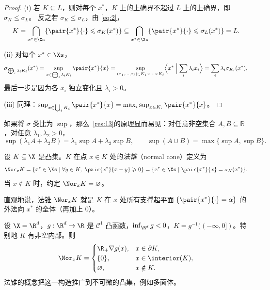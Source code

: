 \begin{proof}
(i) 若 $K\subseteq L$，则对每个 $x^*$，$K$ 上的上确界不超过 $L$ 上的上确界，即 $\sigma_K\leqslant\sigma_L$。
反之若 $\sigma_K\leqslant\sigma_L$，由 \eqref{eq:2}，
\[
  K=\bigcap_{x^*\in\Xs}\{\pair{x^*}{\cdot}\leqslant\sigma_K(x^*)\}\subseteq\bigcap_{x^*\in\Xs}\{\pair{x^*}{\cdot}\leqslant\sigma_L(x^*)\}=L .
\]

(ii) 对每个 $x^*\in\Xs$，
\[
  \sigma_{\bigoplus_i\lambda_iK_i}(x^*)=\sup_{x\in\bigoplus_i\lambda_iK_i}\pair{x^*}{x}
  =\sup_{(x_1,\dots,x_\ell)\in K_1\times\dots\times K_\ell}\Bigl\langle x^*\Bigm|\sum_i\lambda_ix_i\Bigr\rangle
  =\sum_i\lambda_i\sigma_{K_i}(x^*),
\]
最后一步是因为各 $x_i$ 独立变化且 $\lambda_i>0$。

(iii) 同理：$\sup_{x\in\bigcup_iK_i}\pair{x^*}{x}=\max_i\sup_{x\in K_i}\pair{x^*}{x}$。
\end{proof}

\begin{remark}
如果将 $\sigma$ 类比为 $\sup$，那么~\ref{res:13}的原理显而易见：对任意非空集合 $A,B\subseteq\mathbb R$，对任意 $\lambda_1,\lambda_2>0$，
\[
  \sup(\lambda_1A+\lambda_2B)=\lambda_1\sup A+\lambda_2\sup B,\qquad \sup(A\cup B)=\max\{\sup A,\sup B\}. 
\]
\end{remark}

\begin{definition}[法锥]
\label{def:10}
设 $K\subseteq\X$ 是凸集。$K$ 在点 $x\in K$ 处的\emph{法锥}（normal cone）定义为
\[
  \Nor_xK=\{x^*\in\Xs\mid\forall y\in K,\ \pair{x^*}{x-y}\geqslant0\}=\{x^*\in\Xs\mid\pair{x^*}{x}=\sigma_K(x^*)\}.
\]
当 $x\notin K$ 时，约定 $\Nor_xK=\varnothing$。
\end{definition}

直观地说，法锥 $\Nor_xK$ 就是 $K$ 在 $x$ 处所有支撑超平面 $\{\pair{x^*}{\cdot}=\alpha\}$ 的外法向 $x^*$ 的全体（再加上 $0$）。

\begin{example}[光滑下水平集]
\label{exa:3}
设 $\X=\R^d$，$g:\R^d\to\R$ 是 $\mathcal C^1$ 凸函数，$\inf_{\R^d}g<0$，$K=g^{-1}((-\infty,0])$。特别地 $K$ 有非空内部。则
\[
  \Nor_xK=\begin{cases}
    \R_+\nabla g(x), & x\in\partial K,\\
    \{0\}, & x\in\interior(K),\\
    \varnothing, & x\notin K.
  \end{cases}
\]
法锥的概念把这一构造推广到不可微的凸集，例如多面体。
\end{example}

